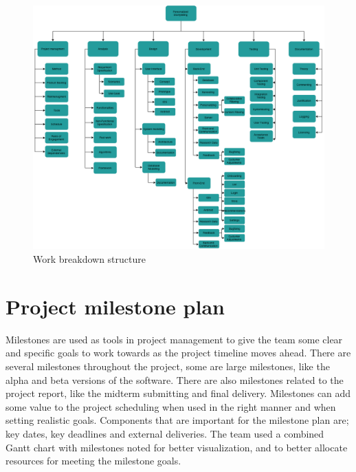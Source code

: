 \begin{figure}[h!]
	\centering
	\includegraphics[width=\textwidth]{fig/wbs}
	\caption{Work breakdown structure}
	\label{Fig:wbs}
\end{figure}

\section{Project milestone plan}
\label{sec:milestone_plan}

Milestones are used as tools in project management to give the team some clear and specific goals to work towards as the project timeline moves ahead. There are several milestones throughout the project, some are large milestones, like the alpha and beta versions of the software. There are also milestones related to the project report, like the midterm submitting and final delivery. Milestones can add some value to the project scheduling when used in the right manner and when setting realistic goals. Components that are important for the milestone plan are; key dates, key deadlines and external deliveries. The team used a combined Gantt chart with milestones noted for better visualization, and to better allocate resources for meeting the milestone goals.\newline

